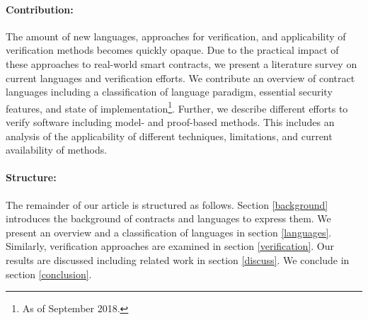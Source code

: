 \paragraph{Contribution:} The amount of new languages, approaches for verification, and applicability of verification methods becomes quickly opaque. Due to the practical impact of these approaches to real-world smart contracts, we present a literature survey on current languages and verification efforts.
We contribute an overview of contract languages including a classification of language paradigm, essential security features, and state of implementation\footnote{As of September 2018.}.
Further, we describe different efforts to verify software including model- and proof-based methods. This includes an analysis of the applicability of different techniques, limitations, and current availability of methods.

\paragraph{Structure:} The remainder of our article is structured as follows. Section \ref{background} introduces the background of contracts and languages to express them. We present an overview and a classification of languages in section \ref{languages}. Similarly, verification approaches are examined in section \ref{verification}. Our results are discussed including related work in section \ref{discuss}. We conclude in section \ref{conclusion}.